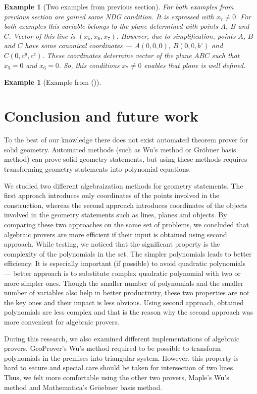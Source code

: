 \documentclass[final,1p,times,authoryear]{elsarticle}
\newtheorem{example}[theorem]{Example}
\begin{document}
\begin{example}[Two examples from previous section]
For both examples from previous section are gained same NDG
condition. It is expressed with $x_7 \neq 0$. For both examples this
variable belongs to the plane determined with points $A$, $B$ and
$C$. Vector of this line is $(x_5, x_6, x_7)$. However, due to
simplification, points $A$, $B$ and $C$ have some canonical
coordinates --- $A(0, 0, 0)$, $B(0, 0, b^z)$ and $C(0, c^y,
c^z)$. These coordinates determine vector of the plane $ABC$ such that
$x_5 = 0$ and $x_6 = 0$. So, this conditions $x_7 \neq 0$ enables that
plane is well defined.
\end{example}

\begin{example}[Example from (\cite{arhzbirka})]
\end{example}

\section{Conclusion and future work}

To the best of our knowledge there does not exist automated theorem
prover for solid geometry. Automated methods (such as Wu's method or
Gr\"obner basis method) can prove solid geometry statements, but using
these methods requires transforming geometry statements into
polynomial equations.

We studied two different algebraization methods for geometry
statements. The first approach introduces only coordinates of the
points involved in the construction, whereas the second approach
introduces coordinates of the objects involved in the geometry
statements such as lines, planes and objects. By comparing these two
approaches on the same set of problems, we concluded that algebraic
provers are more efficient if their input is obtained using second
approach. While testing, we noticed that the significant property is
the complexity of the polynomials in the set. The simpler polynomials
leads to better efficiency. It is especially important (if possible)
to avoid quadratic polynomials --- better approach is to substitute
complex quadratic polynomial with two or more simpler ones. Though the
smaller number of polynomials and the smaller number of variables also
help in better productivity, these two properties are not the key ones
and their impact is less obvious. Using second approach, obtained
polynomials are less complex and that is the reason why the second
approach was more convenient for algebraic provers.

During this research, we also examined different implementations of
algebraic provers. GeoProver's Wu's method required to be possible to
transform polynomials in the premises into triangular system. However,
this property is hard to secure and special care should be taken for
intersection of two lines. Thus, we felt more comfortable using the
other two provers, Maple's Wu's method and Mathematica's Gr\"oebner
basis method.





\end{document}
